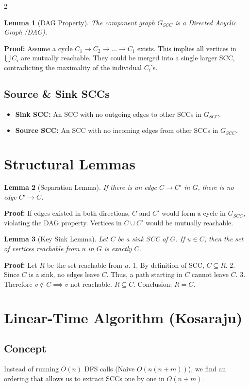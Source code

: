 \documentclass[a4paper,10pt]{article}
\newtheorem*{lemma}{Lemma}
\begin{document}
\begin{multicols}{2}
\begin{lemma}[DAG Property]
The component graph $G_{SCC}$ is a Directed Acyclic Graph (DAG).
\end{lemma}
\textbf{Proof:} Assume a cycle $C_1 \to C_2 \to \dots \to C_1$ exists. This implies all vertices in $\bigcup C_i$ are mutually reachable. They could be merged into a single larger SCC, contradicting the maximality of the individual $C_i$'s.

\subsection{Source \& Sink SCCs}
\begin{itemize}
    \item \textbf{Sink SCC:} An SCC with no outgoing edges to other SCCs in $G_{SCC}$.
    \item \textbf{Source SCC:} An SCC with no incoming edges from other SCCs in $G_{SCC}$.
\end{itemize}

\section{Structural Lemmas}

\begin{lemma}[Separation Lemma]
If there is an edge $C \to C'$ in $G$, there is no edge $C' \to C$.
\end{lemma}
\textbf{Proof:} If edges existed in both directions, $C$ and $C'$ would form a cycle in $G_{SCC}$, violating the DAG property. Vertices in $C \cup C'$ would be mutually reachable.

\begin{lemma}[Key Sink Lemma]
Let $C$ be a sink SCC of $G$. If $u \in C$, then the set of vertices reachable from $u$ in $G$ is exactly $C$.
\end{lemma}
\textbf{Proof:}
Let $R$ be the set reachable from $u$.
1. By definition of SCC, $C \subseteq R$.
2. Since $C$ is a sink, no edges leave $C$. Thus, a path starting in $C$ cannot leave $C$.
3. Therefore $v \notin C \implies v$ not reachable. $R \subseteq C$.
Conclusion: $R = C$.

\section{Linear-Time Algorithm (Kosaraju)}

\subsection{Concept}
Instead of running $O(n)$ DFS calls (Naive $O(n(n+m))$), we find an ordering that allows us to extract SCCs one by one in $O(n+m)$.


\end{multicols}
\end{document}
